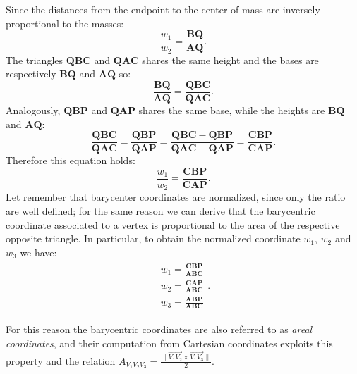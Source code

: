 Since the  distances from the endpoint to the center of mass are inversely proportional to the masses:
\begin{equation}
 \frac{w_1}{w_2} = \frac{\mathbf{BQ}}{\mathbf{AQ}}.
\end{equation}
The triangles $\mathbf{QBC}$ and $\mathbf{QAC}$ shares the same height and the bases are respectively $\mathbf{BQ}$ and $\mathbf{AQ}$ so:
\begin{equation}
 \frac{\mathbf{BQ}}{\mathbf{AQ}}  = \frac{\mathbf{QBC}}{\mathbf{QAC}}.
\end{equation}
Analogously, $\mathbf{QBP}$ and $\mathbf{QAP}$ shares the same base, while the heights are $\mathbf{BQ}$ and $\mathbf{AQ}$:
\begin{equation}
  \frac{\mathbf{QBC}}{\mathbf{QAC}} =  \frac{\mathbf{QBP}}{\mathbf{QAP}} = 
  \frac{\mathbf{QBC-QBP}}{\mathbf{QAC-QAP}} = \frac{\mathbf{CBP}}{\mathbf{CAP}}.
\end{equation}
Therefore this equation holds:
\begin{equation}
  \frac{w_1}{w_2} =  \frac{\mathbf{CBP}}{\mathbf{CAP}}.
\end{equation}
Let remember that barycenter coordinates are normalized, since only the ratio are well defined; for the same reason we can derive that the barycentric coordinate associated to a vertex is proportional to the area of the respective opposite triangle.
In particular, to obtain the normalized coordinate $w_1$, $w_2$ and $w_3$ we have:
\begin{align}
\label{eqn:eqlabel}
\begin{split}
 w_1 =  \frac{\mathbf{CBP}}{\mathbf{ABC}} \\
 w_2 =  \frac{\mathbf{CAP}}{\mathbf{ABC}} \\
 w_3 =  \frac{\mathbf{ABP}}{\mathbf{ABC}} 
\end{split}.
\end{align}


For this reason the barycentric coordinates are also referred to as \emph{areal coordinates}, and their computation from Cartesian coordinates exploits this property and the relation $A_{V_1V_2V_3} = \frac{\| \overrightarrow{V_1V_2} \times \overrightarrow{V_1V_3}  \|}{2}$.










